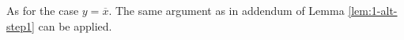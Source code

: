\documentclass [11pt]{article}
\newcommand{\True}{\mathbf{true}}
\newcommand{\False}{\mathbf{false}}
\newcommand{\lit}{\mathit{Lit}}
\newcommand{\reach}{\leadsto}
\begin{document}
%
%

As for the case $y=\overline{x}$. The same argument as in addendum of Lemma \ref{lem:1-alt-step1} can be applied.
\end{document}
